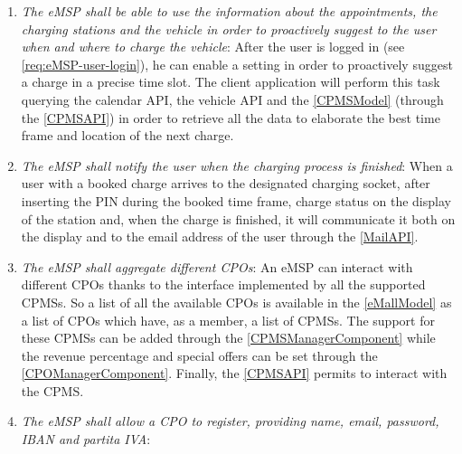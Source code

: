 \begin{enumerate}[label=\textbf{R\arabic*}]
    \label{req:eMSP-connect-calendar}
    \item \textit{The \ac{eMSP} shall be able to use the information about the appointments, the charging stations and the vehicle in order to proactively suggest to the user when and where to charge the vehicle}:
    After the user is logged in (see \ref{req:eMSP-user-login}), he can enable a setting in order to proactively suggest a charge in a precise time slot. 
    The client application will perform this task querying the calendar API, the vehicle API and the \ref{CPMSModel} (through the \ref{CPMSAPI}) in order to retrieve all the data to elaborate the best time frame and location of the next charge.
    \label{req:eMSP-proactive-suggestions}
    \item \textit{The \ac{eMSP} shall notify the user when the charging process is finished}:
    When a user with a booked charge arrives to the designated charging socket, after inserting the PIN during the booked time frame, charge status on the display of the station and, when the charge is finished, it will communicate it both on the display and to the email address of the user through the \ref{MailAPI}.
    \label{req:eMSP-notification}
    \item \textit{The \ac{eMSP} shall aggregate different \acp{CPO}}:
    An \ac{eMSP} can interact with different \acp{CPO} thanks to the interface implemented by all the supported \acp{CPMS}. 
    So a list of all the available \acp{CPO} is available in the \ref{eMallModel} as a list of \acp{CPO} which have, as a member, a list of \acp{CPMS}. 
    The support for these \acp{CPMS} can be added through the \ref{CPMSManagerComponent} while the revenue percentage and special offers can be set through the \ref{CPOManagerComponent}. 
    Finally, the \ref{CPMSAPI} permits to interact with the \ac{CPMS}.
    \label{req:eMSP-compatible}
    \item \textit{The \ac{eMSP} shall allow a \ac{CPO} to register, providing name, email, password, \ac{IBAN} and \gls{partita IVA}}: 

\end{enumerate}

